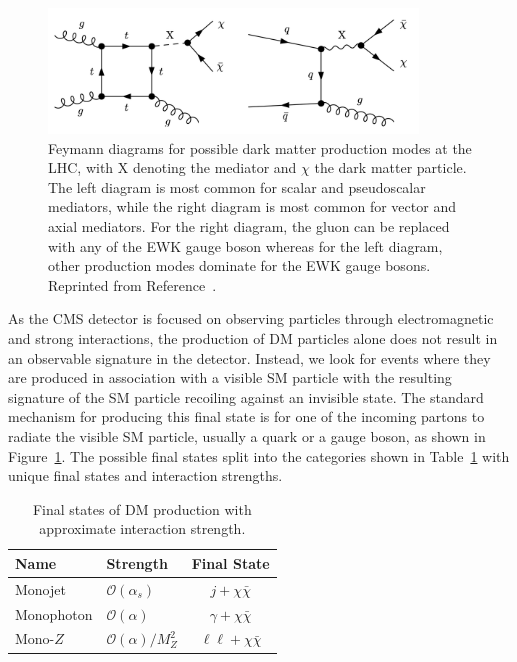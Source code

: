 \begin{figure}[htbp]
  \centering
  \includegraphics[width=0.875\textwidth]{DarkMatter/Figures/dm_diagram.png}
  \caption{
    Feymann diagrams for possible dark matter production modes at the LHC, with X denoting the mediator and $\chi$ the dark matter particle.
    The left diagram is most common for scalar and pseudoscalar mediators, while the right diagram is most common for vector and axial mediators.
    For the right diagram, the gluon can be replaced with any of the EWK gauge boson whereas for the left diagram, other production modes dominate for the EWK gauge bosons.
    Reprinted from Reference~\cite{Harris2015}.
  }
  \label{fig:dm_diagram}
\end{figure}

As the CMS detector is focused on observing particles through electromagnetic and strong interactions, the production of DM particles alone does not result in an observable signature in the detector.
Instead, we look for events where they are produced in association with a visible SM particle with the resulting signature of the SM particle recoiling against an invisible state. 
The standard mechanism for producing this final state is for one of the incoming partons to radiate the visible SM particle, usually a quark or a gauge boson, as shown in Figure~\ref{fig:dm_diagram}.
The possible final states split into the categories shown in Table~\ref{tab:monox} with unique final states and interaction strengths.

\begin{table}[htbp]
\centering
\begin{tabular}{ l|l|c }
  Name & Strength & Final State \\
  \hline
  Monojet & $\mathcal{O}(\alpha_s)$ & $j+\chi\bar\chi$ \\
  Monophoton & $\mathcal{O}(\alpha)$ & $\gamma+\chi\bar\chi$ \\
  Mono-$Z$ & $\mathcal{O}(\alpha)/M_Z^2$ & $\ell\ell+\chi\bar\chi$ \\
\end{tabular}
\caption{
  Final states of DM production with approximate interaction strength.
}
\label{tab:monox}
\end{table}

